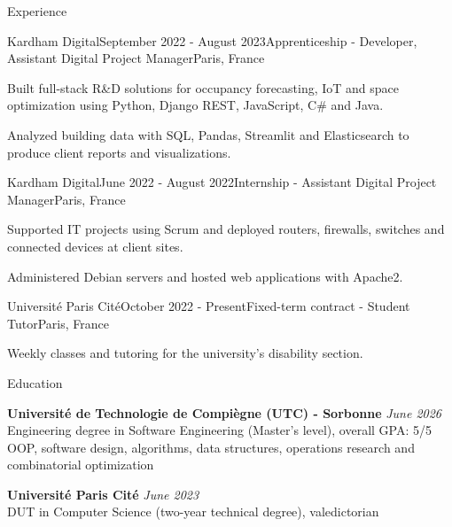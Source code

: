 \documentclass[
    10pt,
]{style} %
\begin{document}
\begin{rSection}{Experience}

        \begin{rSubsection}{Kardham Digital}{September 2022 - August 2023}{Apprenticeship - Developer, Assistant Digital Project Manager}{Paris, France}
            \item Built full-stack R\&D solutions for occupancy forecasting, IoT and space optimization using Python, Django REST, JavaScript, C\# and Java.
            \item Analyzed building data with SQL, Pandas, Streamlit and Elasticsearch to produce client reports and visualizations.
        \end{rSubsection}


        \begin{rSubsection}{Kardham Digital}{June 2022 - August 2022}{Internship - Assistant Digital Project Manager}{Paris, France}
            \item Supported IT projects using Scrum and deployed routers, firewalls, switches and connected devices at client sites.
            \item Administered Debian servers and hosted web applications with Apache2.
        \end{rSubsection}


        \begin{rSubsection}{Université Paris Cité}{October 2022 - Present}{Fixed-term contract - Student Tutor}{Paris, France}
            \item Weekly classes and tutoring for the university's disability section.
        \end{rSubsection}

    \end{rSection}


    \begin{rSection}{Education}

        \textbf{Université de Technologie de Compiègne (UTC) - Sorbonne} \hfill \textit{June 2026} \\
        Engineering degree in Software Engineering (Master's level), overall GPA: 5/5 \\
        OOP, software design, algorithms, data structures, operations research and combinatorial optimization

        \textbf{Université Paris Cité} \hfill \textit{June 2023} \\
        DUT in Computer Science (two-year technical degree), valedictorian

    \end{rSection}
\end{document}
